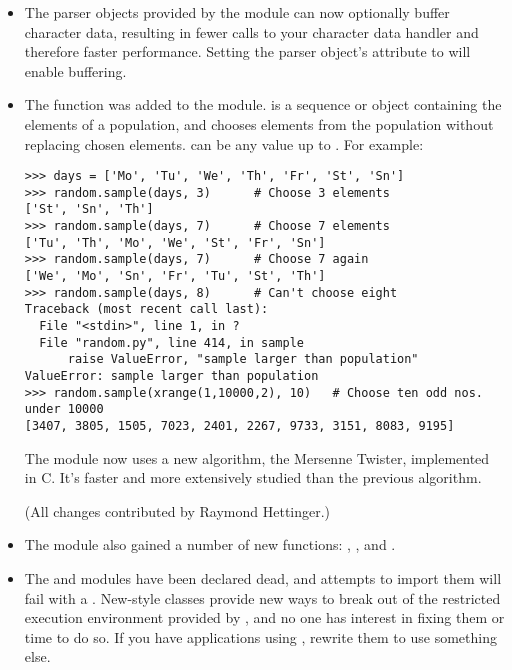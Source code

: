 \documentclass{howto}
\begin{document}
\begin{itemize}
\item The parser objects provided by the  module
can now optionally buffer character data, resulting in fewer calls to
your character data handler and therefore faster performance.  Setting
the parser object's  attribute to 
will enable buffering.

\item The  function was
added to the  module.   is a sequence
or  object containing the elements of a population, and
chooses  elements from the population without replacing chosen
elements.   can be any value up to .
For example:

\begin{verbatim}
>>> days = ['Mo', 'Tu', 'We', 'Th', 'Fr', 'St', 'Sn']
>>> random.sample(days, 3)      # Choose 3 elements
['St', 'Sn', 'Th']
>>> random.sample(days, 7)      # Choose 7 elements
['Tu', 'Th', 'Mo', 'We', 'St', 'Fr', 'Sn']
>>> random.sample(days, 7)      # Choose 7 again
['We', 'Mo', 'Sn', 'Fr', 'Tu', 'St', 'Th']
>>> random.sample(days, 8)      # Can't choose eight
Traceback (most recent call last):
  File "<stdin>", line 1, in ?
  File "random.py", line 414, in sample
      raise ValueError, "sample larger than population"
ValueError: sample larger than population
>>> random.sample(xrange(1,10000,2), 10)   # Choose ten odd nos. under 10000
[3407, 3805, 1505, 7023, 2401, 2267, 9733, 3151, 8083, 9195]
\end{verbatim}

The  module now uses a new algorithm, the Mersenne
Twister, implemented in C.  It's faster and more extensively studied
than the previous algorithm.

(All changes contributed by Raymond Hettinger.)

\item The  module also gained a number of new
functions: ,
, and .

\item The  and  modules have been
declared dead, and attempts to import them will fail with a
.  New-style classes provide new ways to break
out of the restricted execution environment provided by
, and no one has interest in fixing them or time to do
so.  If you have applications using , rewrite them to
use something else.


\end{itemize}
\end{document}
